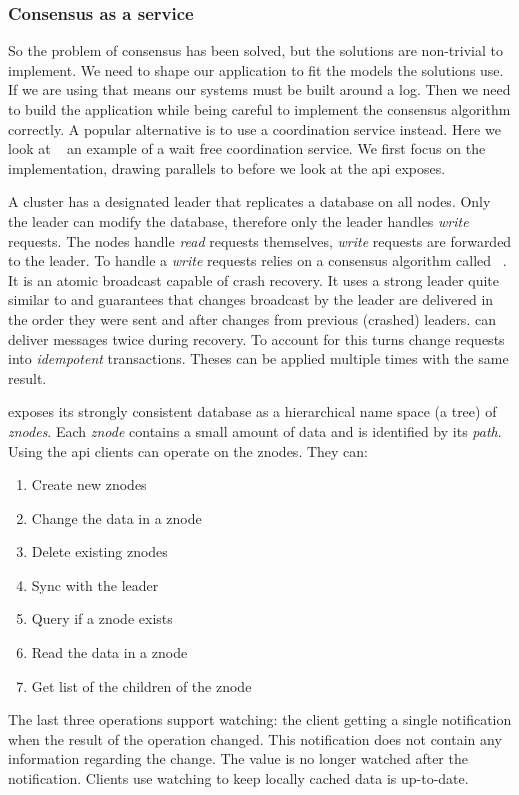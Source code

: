 \subsubsection*{Consensus as a service}
So the problem of consensus has been solved, but the solutions are non-trivial to implement. We need to shape our application to fit the models the solutions use. If we are using \raft{} that means our systems must be built around a log. Then we need to build the application while being careful to implement the consensus algorithm correctly. A popular alternative is to use a coordination service instead. Here we look at \zookeeper{}~\cite{zookeeper} an example of a wait free coordination service. We first focus on the implementation, drawing parallels to \raft{} before we look at the \ac{api} \zookeeper{} exposes.

A \zookeeper{} cluster has a designated leader that replicates a database on all nodes. Only the leader can modify the database, therefore only the leader handles \textit{write} requests. The nodes handle \textit{read} requests themselves, \textit{write} requests are forwarded to the leader. To handle a \textit{write} requests \zookeeper{} relies on a consensus algorithm called \zab{}~\cite{zab}. It is an atomic broadcast capable of crash recovery. It uses a strong leader quite similar to \raft{} and guarantees that changes broadcast by the leader are delivered in the order they were sent and after changes from previous (crashed) leaders. \zab{} can deliver messages twice during recovery. To account for this \zookeeper{} turns change requests into \textit{idempotent} transactions. Theses can be applied multiple times with the same result.

\zookeeper{} exposes its strongly consistent database as a hierarchical name space (a tree) of \textsl{znodes}. Each \textsl{znode} contains a small amount of data and is identified by its \textsl{path}. Using the \ac{api} clients can operate on the znodes. They can: 
%
\begin{multicols}{2}
\begin{enumerate}
	\item Create new znodes
	\item Change the data in a znode
	\item Delete existing znodes
	\item Sync with the leader
	\item Query if a znode exists
	\item Read the data in a znode
	\item Get list of the children of the znode
\end{enumerate}
\end{multicols}
%
The last three operations support watching: the client getting a single notification when the result of the operation changed. This notification does not contain any information regarding the change. The value is no longer watched after the notification. Clients use watching to keep locally cached data is up-to-date. 


